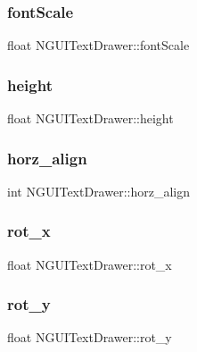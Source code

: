 \subsubsection{\texorpdfstring{font\+Scale}{fontScale}}
{\footnotesize\ttfamily float N\+G\+U\+I\+Text\+Drawer\+::font\+Scale}

\hypertarget{class_n_g_u_i_text_drawer_a25f6ccd2d0751bc4bcc7ba8ac6852844}{}\label{class_n_g_u_i_text_drawer_a25f6ccd2d0751bc4bcc7ba8ac6852844} 
\subsubsection{\texorpdfstring{height}{height}}
{\footnotesize\ttfamily float N\+G\+U\+I\+Text\+Drawer\+::height}

\hypertarget{class_n_g_u_i_text_drawer_aa4c81a138e5e11957add4db6e324c126}{}\label{class_n_g_u_i_text_drawer_aa4c81a138e5e11957add4db6e324c126} 
\subsubsection{\texorpdfstring{horz\+\_\+align}{horz\_align}}
{\footnotesize\ttfamily int N\+G\+U\+I\+Text\+Drawer\+::horz\+\_\+align}

\hypertarget{class_n_g_u_i_text_drawer_a3a78c83ca5ea0998147a1783da70165a}{}\label{class_n_g_u_i_text_drawer_a3a78c83ca5ea0998147a1783da70165a} 
\subsubsection{\texorpdfstring{rot\+\_\+x}{rot\_x}}
{\footnotesize\ttfamily float N\+G\+U\+I\+Text\+Drawer\+::rot\+\_\+x}

\hypertarget{class_n_g_u_i_text_drawer_ac8f4c18616190bf1abb543e817570262}{}\label{class_n_g_u_i_text_drawer_ac8f4c18616190bf1abb543e817570262} 
\subsubsection{\texorpdfstring{rot\+\_\+y}{rot\_y}}
{\footnotesize\ttfamily float N\+G\+U\+I\+Text\+Drawer\+::rot\+\_\+y}

